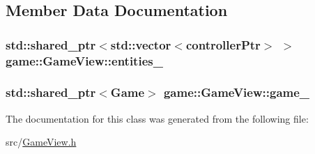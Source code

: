 \subsection{\-Member \-Data \-Documentation}
\hypertarget{classgame_1_1GameView_af7a0cc6b98555b965270c9c0bda31508}{
\subsubsection[{entities\-\_\-}]{\setlength{\rightskip}{0pt plus 5cm}std\-::shared\-\_\-ptr$<$std\-::vector$<${\bf controller\-Ptr}$>$ $>$ {\bf game\-::\-Game\-View\-::entities\-\_\-}}}\label{d1/d82/classgame_1_1GameView_af7a0cc6b98555b965270c9c0bda31508}
\hypertarget{classgame_1_1GameView_ab2f5d618b746010ecb43798caba340ed}{
\subsubsection[{game\-\_\-}]{\setlength{\rightskip}{0pt plus 5cm}std\-::shared\-\_\-ptr$<${\bf \-Game}$>$ {\bf game\-::\-Game\-View\-::game\-\_\-}}}\label{d1/d82/classgame_1_1GameView_ab2f5d618b746010ecb43798caba340ed}


\-The documentation for this class was generated from the following file\-:\begin{DoxyCompactItemize}
\item 
src/\hyperlink{GameView_8h}{\-Game\-View.\-h}\end{DoxyCompactItemize}
